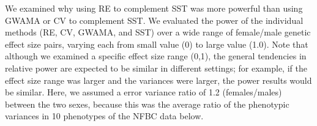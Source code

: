 \documentclass[11pt]{article}
\begin{document}
We examined why using RE to complement SST was more powerful 
than using GWAMA or CV to complement SST. 
We evaluated the power of the individual methods (RE, CV, GWAMA, and SST)
over a wide range of female/male genetic effect size pairs, varying each from small value (0) to large value (1.0).
Note that although we examined a specific effect size range (0,1), 
the general tendencies in relative power are expected to be similar in different settings;
for example, if the effect size range was larger and the variances were larger, the power results
would be similar. 
Here, we assumed a error variance ratio of 1.2 (females/males) between the two sexes, %
because this was the average ratio of the phenotypic variances in 10 phenotypes of the NFBC data below.
\end{document}
